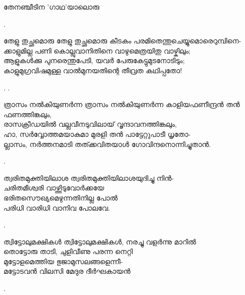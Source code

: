 \begin{enumerate}
\begin{slokam}{\VSv}{\KA}{തേനഞ്ചീടിന 'ഗാഥ'യാലൊരു}
\end{slokam}


.


\begin{slokam}{\VKm}{\KV}{തേളു തുച്ഛമൊരു}
തേളു തുച്ഛമൊരു കീടകം പരമിതെന്തുചെയ്യുമൊരെറുമ്പിനെ-\\
ക്കാളുമില്ല പണി കൊല്ലുവാനിതിനെ വാഴുമെത്രയിതു വാഴ്കിലും;\\
ആളുകള്‍ക്കു പുനരെന്തുപേടി, യവർ പേരുകേട്ടുമുടനോടിടും;\\
കാളുമുഗ്രവിഷമുള്ള വാൽമുനയതിന്റെ തീവ്രത കഥിപ്പതോ!
\end{slokam}


.
.


\begin{slokam}{\VSv}{\VNM}{ത്രാസം നൽകിയുണർന്ന}
ത്രാസം നൽകിയുണർന്ന കാളിയഫണീന്ദ്രൻ തൻ ഫണത്തിങ്കലും,\\
രാസക്രീഡയിൽ വല്ലവീനടുവിലായ്‌ വൃന്ദാവനത്തിങ്കലും,\\
ഹാ, സർവ്വോത്തമയാകുമാ മുരളി തൻ പാട്ടേറ്റുപാടീ ധൃതോ-\\
ല്ലാസം, നർത്തനമാടി തത്ക്കവിതയാള്‍ ഗോവിന്ദനൊന്നിച്ചുതാൻ.
\end{slokam}


.

\begin{slokam}{\VVt}{\AUK}{ത്വരിതമുക്തിയിലാശ}
ത്വരിതമുക്തിയിലാശയുദിച്ചു നിൻ-\\
ചരിതമീശ്വരി വാഴ്ത്തിടുവോർക്കയേ\\
ഭരിതസൌഖ്യമെഴുന്നതിനില്ല പോൽ\\
പരിധി വാരിധി വാനിവ പോലവേ.
\end{slokam}


.



\begin{slokam}{\VVt}{\VNM}{ത്വിട്ടോലുമക്ഷികള്‍}
ത്വിട്ടോലുമക്ഷികള്‍, നരച്ചു വളർന്നു മാറിൽ\\
തൊട്ടോരു താടി, ചുളിവീണു പരന്ന നെറ്റി\\
മുട്ടോളമെത്തിയ ഭുജാമുസലങ്ങളെന്നീ-\\
മട്ടോടവൻ വിലസി മേദുര ദീർഘകായൻ

\end{slokam}


.



\end{enumerate}

